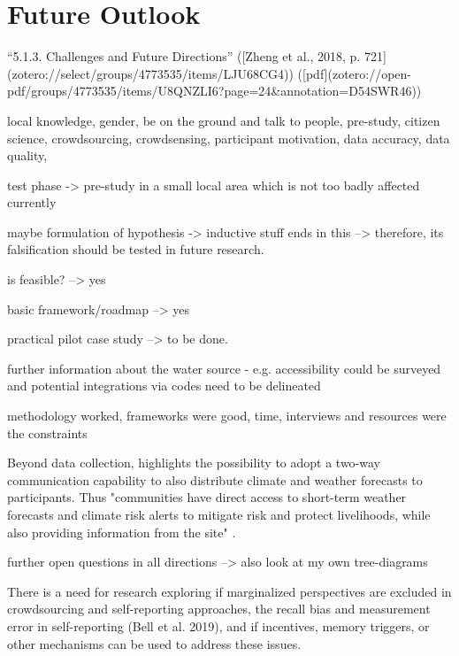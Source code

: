 \section{Future Outlook}

“5.1.3. Challenges and Future Directions” ([Zheng et al., 2018, p. 721](zotero://select/groups/4773535/items/LJU68CG4)) ([pdf](zotero://open-pdf/groups/4773535/items/U8QNZLI6?page=24&annotation=D54SWR46))



local knowledge, gender, be on the ground and talk to people, pre-study, citizen science, crowdsourcing, crowdsensing, participant motivation, data accuracy, data quality,

test phase -> pre-study in a small local area which is not too badly affected currently 

maybe formulation of hypothesis -> inductive stuff ends in this --> therefore, its falsification should be tested in future research.


is feasible? --> yes

basic framework/roadmap --> yes

practical pilot case study --> to be done.


further information about the water source - e.g. accessibility could be surveyed and potential integrations via codes need to be delineated


methodology worked, frameworks were good, time, interviews and resources were the constraints



Beyond data collection, \autocite{gualazziniEWEAEarlyWarning2021} highlights the possibility to adopt a two-way communication capability to also distribute climate and weather forecasts to participants. Thus "communities have direct access to short-term weather forecasts and climate risk alerts to mitigate risk and protect livelihoods, while also providing information from the site" \autocite[20]{gualazziniEWEAEarlyWarning2021}. %


further open questions in all directions --> also look at my own tree-diagrams

There is a need for research exploring if marginalized perspectives are excluded in crowdsourcing and self-reporting approaches, the recall bias and measurement error in self-reporting (Bell et al. 2019), and if incentives, memory triggers, or other mechanisms can be used to address these issues.



